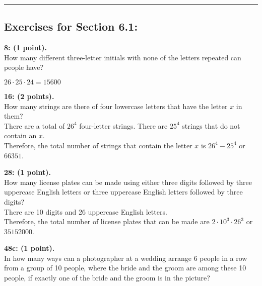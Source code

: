 \documentclass[12pt]{article}  %
\begin{document}
\rule{6in}{.1pt}       %


\subsection*{Exercises for Section 6.1:}     

\noindent
{\bf 8: (1 point).}\\
How many different three-letter initials with none of the letters repeated can people have?

\noindent
$\displaystyle26\cdot25\cdot24=15600$

\noindent
{\bf 16: (2 points).}\\
How many strings are there of four lowercase letters that have the letter $x$ in them?\\
There are a total of $26^4$ four-letter strings. There are $25^4$ strings that do not contain an $x$.\\
Therefore, the total number of strings that contain the letter $x$ is $26^4-25^4$ or $66351$.

\noindent
{\bf 28: (1 point).}\\
\noindent
How many license plates can be made using either three digits followed by three uppercase English letters or three uppercase English letters followed by three digits?\\
There are 10 digits and 26 uppercase English letters.\\
Therefore, the total number of license plates that can be made are $2\cdot10^3\cdot26^3$ or $35152000$.

\noindent
{\bf 48c: (1 point).}\\
In how many ways can a photographer at a wedding arrange 6 people in a row from a group of 10 people, where the bride and the groom are among these 10 people, if exactly one of the bride and the groom is in the picture?
\end{document}
